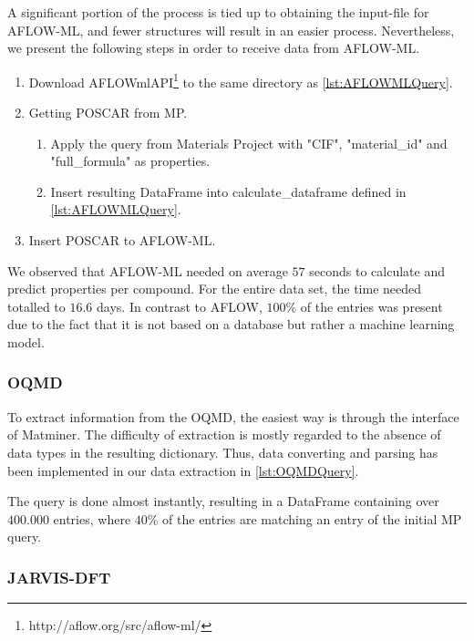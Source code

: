 A significant portion of the process is tied up to obtaining the input-file for AFLOW-ML, and fewer structures will result in an easier process. Nevertheless, we present the following steps in order to receive data from AFLOW-ML.

\begin{enumerate}
  \item Download AFLOWmlAPI\footnote{http://aflow.org/src/aflow-ml/} to the same directory as  \autoref{lst:AFLOWMLQuery}.
  \item Getting POSCAR from MP.
  \begin{enumerate}
    \item Apply the query from Materials Project with "CIF", "material\_id" and "full\_formula" as properties.
    \item Insert resulting DataFrame into calculate\_dataframe defined in \autoref{lst:AFLOWMLQuery}.
  \end{enumerate}
    \item Insert POSCAR to AFLOW-ML.
\end{enumerate}


\noindent We observed that AFLOW-ML needed on average $57$ seconds to calculate and predict properties per compound. For the entire data set, the time needed totalled to $16.6$ days. In contrast to AFLOW, $100\%$ of the entries was present due to the fact that it is not based on a database but rather a machine learning model.

\subsubsection{OQMD}

To extract information from the OQMD, the easiest way is through the interface of Matminer. The difficulty of extraction is mostly regarded to the absence of data types in the resulting dictionary. Thus, data converting and parsing has been implemented in our data extraction in \autoref{lst:OQMDQuery}.

The query is done almost instantly, resulting in a DataFrame containing over $400.000$ entries, where $40$\% of the entries are matching an entry of the initial MP query.



\subsubsection{JARVIS-DFT}

